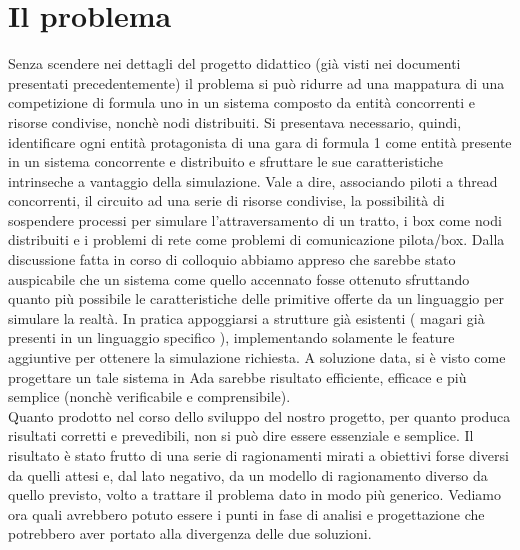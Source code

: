 \section{Il problema}
Senza scendere nei dettagli del progetto didattico (già visti nei documenti presentati precedentemente) il problema si può ridurre ad una mappatura di una competizione di formula uno in un sistema composto da entità concorrenti e risorse condivise, nonchè nodi distribuiti.
Si presentava necessario, quindi, identificare ogni entità protagonista di una gara di formula 1 come entità presente in un sistema concorrente e distribuito e sfruttare le sue caratteristiche intrinseche a vantaggio della simulazione.
Vale a dire, associando piloti a thread concorrenti, il circuito ad una serie di risorse condivise, la possibilità di sospendere processi per simulare l’attraversamento di un tratto, i box come nodi distribuiti e i problemi di rete come problemi di comunicazione pilota/box. 
Dalla discussione fatta in corso di colloquio abbiamo appreso che sarebbe stato auspicabile che un sistema come quello accennato fosse ottenuto sfruttando quanto più possibile le caratteristiche delle primitive offerte da un linguaggio per simulare la realtà. In pratica appoggiarsi a strutture già esistenti ( magari già presenti in un linguaggio specifico ), implementando solamente le feature aggiuntive per ottenere la simulazione richiesta.
A soluzione data, si è visto come progettare un tale sistema in Ada sarebbe risultato efficiente, efficace e più semplice (nonchè verificabile e comprensibile).\\
Quanto prodotto nel corso dello sviluppo del nostro progetto, per quanto produca risultati corretti e prevedibili, non si può dire essere essenziale e semplice. Il risultato è stato frutto di una serie di ragionamenti mirati a obiettivi forse diversi da quelli attesi e, dal lato negativo, da un modello di ragionamento diverso da quello previsto, volto a trattare il problema dato in modo più generico. Vediamo ora quali avrebbero potuto essere i punti in fase di analisi e progettazione che potrebbero aver portato alla divergenza delle due soluzioni.
